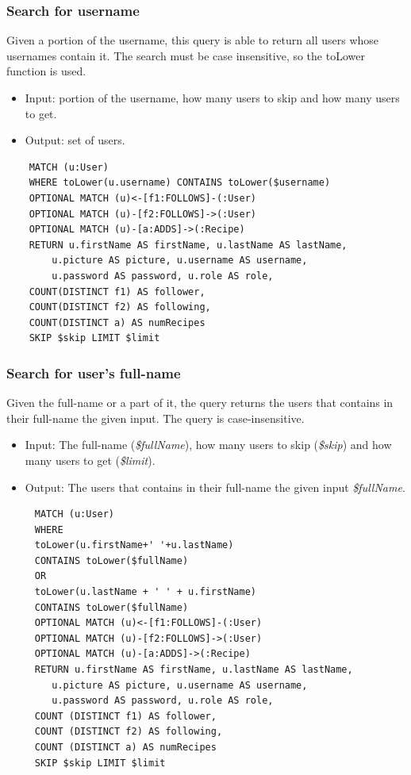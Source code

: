 \documentclass[a4paper]{report}
\begin{document}
\subsubsection{Search for username}
Given a portion of the username, this query is able to return all users whose usernames contain it. The search must be case insensitive, so the toLower function is used. 
\begin{itemize}
\item Input: portion of the username, how many users to skip and how many users to get.
\item Output: set of users.	
\end{itemize}
\lstset{ language=java}
\begin{lstlisting}
	MATCH (u:User)
	WHERE toLower(u.username) CONTAINS toLower($username)
	OPTIONAL MATCH (u)<-[f1:FOLLOWS]-(:User)
	OPTIONAL MATCH (u)-[f2:FOLLOWS]->(:User)
	OPTIONAL MATCH (u)-[a:ADDS]->(:Recipe)
	RETURN u.firstName AS firstName, u.lastName AS lastName, 
		u.picture AS picture, u.username AS username, 
		u.password AS password, u.role AS role, 
	COUNT(DISTINCT f1) AS follower,
	COUNT(DISTINCT f2) AS following, 
	COUNT(DISTINCT a) AS numRecipes
	SKIP $skip LIMIT $limit
\end{lstlisting} 
\subsubsection{Search for user's full-name}
Given the full-name or a part of it, the query returns the users that contains in their full-name the given input. The query is case-insensitive.
\begin{itemize}
	\item Input: The full-name (\emph{\$fullName}), how many users to skip (\emph{\$skip}) and how many users to get (\emph{\$limit}).
	\item Output: The users that contains in their full-name the given input \emph{\$fullName}.
\end{itemize}
\begin{lstlisting}
	 MATCH (u:User) 
	 WHERE
	 toLower(u.firstName+' '+u.lastName)
	 CONTAINS toLower($fullName)
	 OR
	 toLower(u.lastName + ' ' + u.firstName)
	 CONTAINS toLower($fullName)
	 OPTIONAL MATCH (u)<-[f1:FOLLOWS]-(:User)
	 OPTIONAL MATCH (u)-[f2:FOLLOWS]->(:User)
	 OPTIONAL MATCH (u)-[a:ADDS]->(:Recipe)
	 RETURN u.firstName AS firstName, u.lastName AS lastName,
	 	u.picture AS picture, u.username AS username,
	 	u.password AS password, u.role AS role,
	 COUNT (DISTINCT f1) AS follower,
	 COUNT (DISTINCT f2) AS following,
	 COUNT (DISTINCT a) AS numRecipes
	 SKIP $skip LIMIT $limit
\end{lstlisting} 
\end{document}
